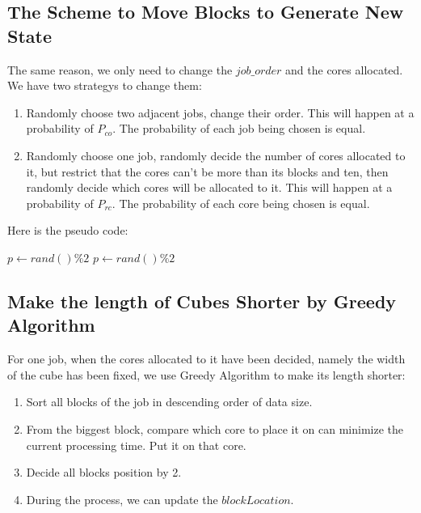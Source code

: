 \documentclass{llncs}
\begin{document}
	\subsection{The Scheme to Move Blocks to Generate New State} \label{subsec-move}
	The same reason, we only need to change the $job\_order$ and the cores allocated. We have two strategys to change them: 
	\begin{enumerate}
		\item Randomly choose two adjacent jobs, change their order. This will happen at a probability of $P_{co}$. The probability of each job being chosen is equal. 
		\item Randomly choose one job, randomly decide the number of cores allocated to it, but restrict that the cores can't be more than its blocks and ten, then randomly decide which cores will be allocated to it. This will happen at a probability of $P_{rc}$. The probability of each core being chosen is equal. 
	\end{enumerate}

	Here is the pseudo code: \\
	\begin{algorithm}[H]
		\BlankLine
		\caption{$move()$} \label{Alg-move}
		$p \leftarrow rand()\% 2$\;
		$p \leftarrow rand()\% 2$\;
		
	\end{algorithm}
	
	\subsection{Make the length of Cubes Shorter by Greedy Algorithm} \label{subsec-GA}
	For one job, when the cores allocated to it have been decided, namely the width of the cube has been fixed, we use Greedy Algorithm to make its length shorter: 
	\begin{enumerate}
		\item Sort all blocks of the job in descending order of data size. 
		\item From the biggest block, compare which core to place it on can minimize the current processing time. Put it on that core. 
		\item Decide all blocks position by 2.
		\item During the process, we can update the $blockLocation$.
	\end{enumerate} 
	
\end{document}
